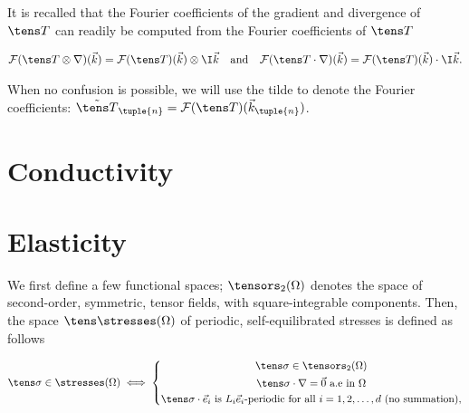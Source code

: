 \documentclass[oneside]{memoir}
\begin{document}
It is recalled that the Fourier coefficients of the gradient and divergence of \(\tens T\) can readily be computed from the Fourier coefficients of \(\tens T\)



\begin{equation*}
\begin{split}\mathcal F(\tens T\otimes\nabla)(\vec k)=\mathcal F(\tens T)(\vec k)\otimes\I\vec k
\quad\text{and}\quad
\mathcal F(\tens T\cdot\nabla)(\vec k)=\mathcal F(\tens T)(\vec k)\cdot\I\vec k.\end{split}\end{equation*}


When no confusion is possible, we will use the tilde to denote the Fourier coefficients: \(\tilde{\tens T}_\tuple{n}=\mathcal F(\tens T)(\vec k_\tuple{n})\).



\hypertarget{6549129120501784746}{}


\section{Conductivity}



\hypertarget{10340496927750756388}{}


\section{Elasticity}



We first define a few functional spaces; \(\tensors_2(\Omega)\) denotes the space of second-order, symmetric, tensor fields, with square-integrable components. Then, the space \(\tens\stresses(\Omega)\) of periodic, self-equilibrated stresses is defined as follows



\begin{equation*}
\begin{split}\tens\sigma\in\stresses(\Omega)\iff\left\{
\begin{gathered}
\tens\sigma\in\tensors_2(\Omega)\\
\tens\sigma\cdot\nabla=\vec 0\text{ a.e in }\Omega\\
\tens\sigma\cdot\vec e_i\text{ is }L_i\vec e_i
\text{-periodic for all }i=1, 2, \ldots, d\text{ (no summation),}
\end{gathered}
\right.\end{split}\end{equation*}
\end{document}
